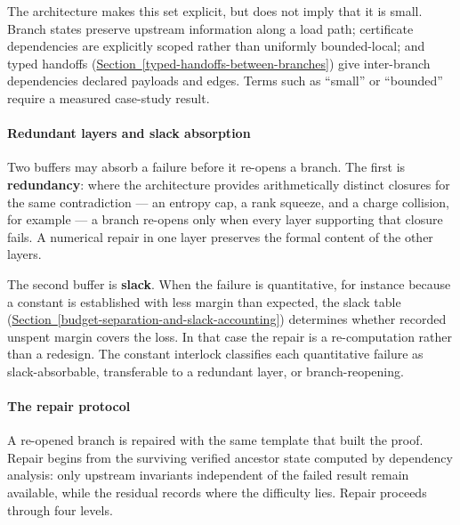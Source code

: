 \documentclass[
  11pt,
]{article}
\theoremstyle{definition}
\newcommand{\secref}[1]{\hyperref[#1]{Section~\ref*{#1}}}
\begin{document}
The architecture makes this set explicit, but does not imply that it is
small. Branch states preserve upstream information along a load path;
certificate dependencies are explicitly scoped rather than uniformly
bounded-local; and typed handoffs (\secref{typed-handoffs-between-branches}) give inter-branch
dependencies declared payloads and edges. Terms such as ``small'' or
``bounded'' require a measured case-study result.

\paragraph{Redundant layers and slack
absorption}\label{redundant-layers-and-slack-absorption}

Two buffers may absorb a failure before it re-opens a branch. The first
is \textbf{redundancy}: where the architecture provides arithmetically
distinct closures for the same contradiction --- an entropy cap, a rank
squeeze, and a charge collision, for example --- a branch re-opens only
when every layer supporting that closure fails. A numerical repair in
one layer preserves the formal content of the other layers.

The second buffer is \textbf{slack}. When the failure is quantitative,
for instance because a constant is established with less margin than
expected, the slack table (\secref{budget-separation-and-slack-accounting}) determines whether recorded
unspent margin covers the loss. In that case the repair is a
re-computation rather than a redesign. The constant interlock classifies
each quantitative failure as slack-absorbable, transferable to a
redundant layer, or branch-reopening.

\paragraph{The repair protocol}\label{the-repair-protocol}

A re-opened branch is repaired with the same template that built the
proof. Repair begins from the surviving verified ancestor state computed
by dependency analysis: only upstream invariants independent of the
failed result remain available, while the residual records where the
difficulty lies. Repair proceeds through four levels.
\end{document}
